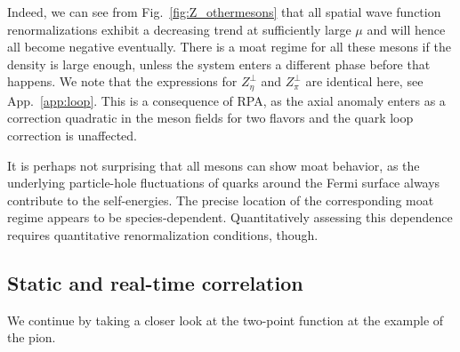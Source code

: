 \documentclass[reprint,english,superscriptaddress,preprintnumbers,amsmath,amssymb,aps,prd]{revtex4-2}
\def\Fig#1{Fig.~\ref{#1}}
\def\App#1{App.~\ref{#1}}
\begin{document}
Indeed, we can see from \Fig{fig:Z_othermesons} that all spatial wave function renormalizations exhibit a decreasing trend at sufficiently large $\mu$ and will hence all become negative eventually. There is a moat regime for all these mesons if the density is large enough, unless the system enters a different phase before that happens. We note that the expressions for $Z^\perp_\eta$ and $Z^\perp_\pi$ are identical here, see \App{app:loop}. This is a consequence of RPA, as the axial anomaly enters as a correction quadratic in the meson fields for two flavors and the quark loop correction is unaffected.

It is perhaps not surprising that all mesons can show moat behavior, as the underlying particle-hole fluctuations of quarks around the Fermi surface always contribute to the self-energies. The precise location of the corresponding moat regime appears to be species-dependent. Quantitatively assessing this dependence requires quantitative renormalization conditions, though.



\subsection{Static and real-time correlation}
\label{subsec:correlation_function}

We continue by taking a closer look at the two-point function at the example of the pion.
\end{document}
